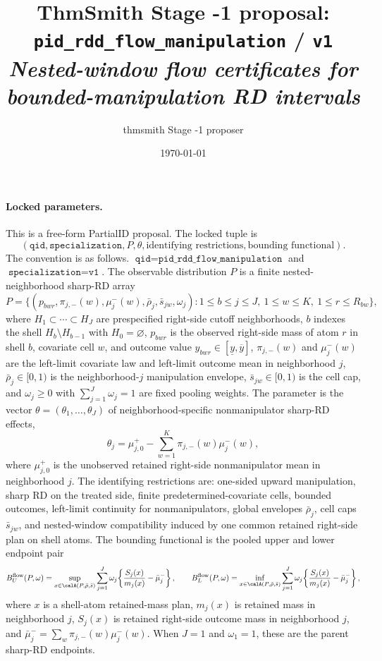 \documentclass[11pt]{article}
\title{ThmSmith Stage -1 proposal: \texttt{pid\_rdd\_flow\_manipulation} / \texttt{v1}%
  \\ \large\textit{Nested-window flow certificates for bounded-manipulation RD intervals}}
\author{thmsmith Stage -1 proposer}
\date{\today}
\theoremstyle{definition}
\theoremstyle{plain}
\theoremstyle{remark}
\begin{document}
\maketitle


\paragraph{Locked parameters.}
This is a free-form PartialID proposal.
The locked tuple is
\[
  (\texttt{qid}, \texttt{specialization}, P, \theta, \text{identifying restrictions},
  \text{bounding functional}).
\]
The convention is as follows.
\(\texttt{qid}=\texttt{pid\_rdd\_flow\_manipulation}\) and
\(\texttt{specialization}=\texttt{v1}\).
The observable distribution \(P\) is a finite nested-neighborhood sharp-RD array
\[
  P=\bigl\{(p_{bwr},\pi_{j,-}(w),\mu^-_j(w),\bar\rho_j,\bar s_{jw},\omega_j):
  1\le b\le j\le J,\ 1\le w\le K,\ 1\le r\le R_{bw}\bigr\},
\]
where \(H_1\subset \cdots \subset H_J\) are prespecified right-side cutoff neighborhoods,
\(b\) indexes the shell \(H_b\setminus H_{b-1}\) with \(H_0=\varnothing\),
\(p_{bwr}\) is the observed right-side mass of atom \(r\) in shell \(b\), covariate cell \(w\),
and outcome value \(y_{bwr}\in[\underline y,\overline y]\),
\(\pi_{j,-}(w)\) and \(\mu^-_j(w)\) are the left-limit covariate law and left-limit outcome mean
in neighborhood \(j\),
\(\bar\rho_j\in[0,1)\) is the neighborhood-\(j\) manipulation envelope,
\(\bar s_{jw}\in[0,1)\) is the cell cap, and \(\omega_j\ge0\) with \(\sum_{j=1}^J\omega_j=1\)
are fixed pooling weights.
The parameter is the vector \(\theta=(\theta_1,\ldots,\theta_J)\) of neighborhood-specific
nonmanipulator sharp-RD effects,
\[
  \theta_j=\mu^+_{j,0}-\sum_{w=1}^K \pi_{j,-}(w)\mu^-_j(w),
\]
where \(\mu^+_{j,0}\) is the unobserved retained right-side nonmanipulator mean in neighborhood \(j\).
The identifying restrictions are: one-sided upward manipulation, sharp RD on the treated side,
finite predetermined-covariate cells, bounded outcomes, left-limit continuity for nonmanipulators,
global envelopes \(\bar\rho_j\), cell caps \(\bar s_{jw}\), and nested-window compatibility induced by
one common retained right-side plan on shell atoms.
The bounding functional is the pooled upper and lower endpoint pair
\[
  B_U^{\mathrm{flow}}(P,\omega)=\sup_{x\in\calA(P,\bar\rho,\bar s)}
  \sum_{j=1}^J \omega_j\!\left\{\frac{S_j(x)}{m_j(x)}-\bar\mu^-_j\right\},
  \qquad
  B_L^{\mathrm{flow}}(P,\omega)=\inf_{x\in\calA(P,\bar\rho,\bar s)}
  \sum_{j=1}^J \omega_j\!\left\{\frac{S_j(x)}{m_j(x)}-\bar\mu^-_j\right\},
\]
where \(x\) is a shell-atom retained-mass plan, \(m_j(x)\) is retained mass in neighborhood \(j\),
\(S_j(x)\) is retained right-side outcome mass in neighborhood \(j\), and
\(\bar\mu^-_j=\sum_w \pi_{j,-}(w)\mu^-_j(w)\).
When \(J=1\) and \(\omega_1=1\), these are the parent sharp-RD endpoints.
\end{document}
